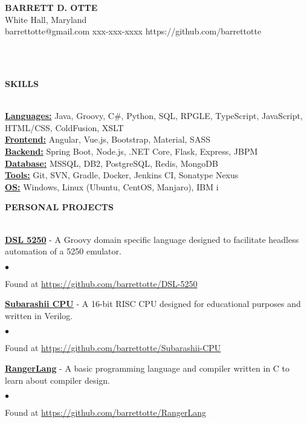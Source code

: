 \documentclass{article}
\newcommand{\lineunder}{
	\vspace*{-4pt}\\ 
	\hspace*{-18pt}\hrulefill \\
}
\newcommand{\header}[1]{
	{\hspace*{-15pt}\vspace*{6pt}\textsc{#1}}\vspace*{-6pt}\lineunder
}
\newcommand{\project}[2]{
	{\textbf{\underline{#1}} - #2{\hfill}\vspace*{3pt}}
}
\newcommand{\contact}[5]{
	\vspace*{-8pt}
	\begin{center}
		{\Large \textbf \scshape {#1}}\\
		\normalsize #2\\
		\normalsize #3 \hspace*{20pt} 
		\normalsize #4 \hspace*{20pt}
		\normalsize #5
		\lineunder
	\end{center}
	\vspace*{-8pt}
}
\newenvironment{resumecontent}{
	\begin{list}
		{\small$\bullet$}{\topsep 0pt \itemsep -2pt}}{\vspace*{4pt}
	\end{list}
}
\newcommand{\resumeheader}[1]{
	\vspace*{10pt}
	\header{\textbf{#1}}
    \vspace*{5pt}
}
\begin{document}
	\normalsize
	\smallskip
	\vspace*{-44pt}

	\contact
		{\bfseries BARRETT D. OTTE}
		{White Hall, Maryland}
		{barrettotte@gmail.com}
		{xxx-xxx-xxxx}
		{https://github.com/barrettotte}

	\resumeheader{SKILLS}
		\textbf{\underline{Languages:}}
			Java, Groovy, C\#, Python, SQL, RPGLE, TypeScript, JavaScript, HTML/CSS, ColdFusion, XSLT \\ \vspace*{5pt}
		\textbf{\underline{Frontend:}}
			Angular, Vue.js, Bootstrap, Material, SASS \\ \vspace*{5pt}
        \textbf{\underline{Backend:}}
			Spring Boot, Node.js, .NET Core, Flask, Express, JBPM \\ \vspace*{5pt}
        \textbf{\underline{Database:}}
			MSSQL, DB2, PostgreSQL, Redis, MongoDB \\ \vspace*{5pt}
		\textbf{\underline{Tools:}}
			Git, SVN, Gradle, Docker, Jenkins CI, Sonatype Nexus \\ \vspace*{5pt}
        \textbf{\underline{OS:}}
            Windows, Linux (Ubuntu, CentOS, Manjaro), IBM i

	\resumeheader{PERSONAL PROJECTS}
		\project
			{DSL 5250}
			{A Groovy domain specific language designed to facilitate headless automation of a 5250 emulator.}
			\begin{resumecontent}
				\item Found at \href{https://github.com/barrettotte/DSL-5250}
					{https://github.com/barrettotte/DSL-5250}
			\end{resumecontent}
            \vspace*{3pt}
		\project
			{Subarashii CPU}
			{A 16-bit RISC CPU designed for educational purposes and written in Verilog.}
            \begin{resumecontent}
				\item Found at \href{https://github.com/barrettotte/Subarashii-CPU}
					{https://github.com/barrettotte/Subarashii-CPU}
			\end{resumecontent}
            \vspace*{3pt}
		\project
			{RangerLang}
			{A basic programming language and compiler written in C to learn about compiler design.}
            \begin{resumecontent}
				\item Found at \href{https://github.com/barrettotte/RangerLang}
					{https://github.com/barrettotte/RangerLang}
			\end{resumecontent}
\end{document}
